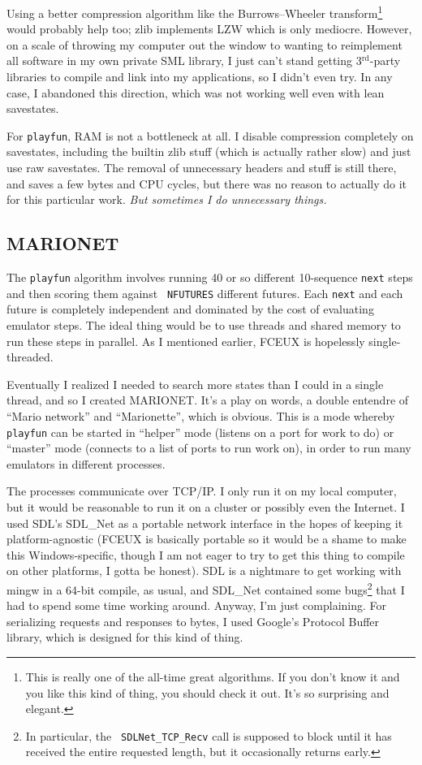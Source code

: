 \documentclass[twocolumn]{article}
\newcommand\rd{$^{\mathrm{rd}}$}
\begin{document}
Using a better compression algorithm like the Burrows--Wheeler
transform\cite{Burrows}\footnote{This is really one of the all-time
  great algorithms. If you don't know it and you like this kind of
  thing, you should check it out. It's so surprising and elegant.}
would probably help too; zlib implements LZW which is only mediocre.
However, on a scale of throwing my computer out the window to wanting
to reimplement all software in my own private SML library, I just
can't stand getting 3\rd-party libraries to compile and link into my
applications, so I didn't even try. In any case, I abandoned this
direction, which was not working well even with lean savestates.

For {\tt playfun}, RAM is not a bottleneck at all. I disable
compression completely on savestates, including the builtin zlib stuff
(which is actually rather slow) and just use raw savestates. The
removal of unnecessary headers and stuff is still there, and saves a
few bytes and CPU cycles, but there was no reason to actually do it
for this particular work. {\em But sometimes I do unnecessary things.}

\subsection{MARIONET}

The {\tt playfun} algorithm involves running 40 or so different
10-sequence {\tt next} steps and then scoring them against {\tt
  NFUTURES} different futures. Each {\tt next} and each future is
completely independent and dominated by the cost of evaluating
emulator steps. The ideal thing would be to use threads and shared
memory to run these steps in parallel. As I mentioned earlier,
FCEUX is hopelessly single-threaded.

Eventually I realized I needed to search more states than I could in a
single thread, and so I created MARIONET. It's a play on words, a
double entendre of ``Mario network'' and ``Marionette'', which is
obvious. This is a mode whereby {\tt playfun} can be started in
``helper'' mode (listens on a port for work to do) or ``master'' mode
(connects to a list of ports to run work on), in order to run
many emulators in different processes.

The processes communicate over TCP/IP. I only run it on my local
computer, but it would be reasonable to run it on a cluster or
possibly even the Internet. I used SDL's SDL\_Net\cite{SDLNet} as a
portable network interface in the hopes of keeping it
platform-agnostic (FCEUX is basically portable so it would be a shame
to make this Windows-specific, though I am not eager to try to get
this thing to compile on other platforms, I gotta be honest). SDL is a
nightmare to get working with mingw in a 64-bit compile, as usual, and
SDL\_Net contained some bugs\footnote{In particular, the {\tt
    SDLNet\_TCP\_Recv} call is supposed to block until it has received
  the entire requested length, but it occasionally returns early.}
that I had to spend some time working around. Anyway, I'm just
complaining. For serializing requests and responses to bytes, I used
Google's Protocol Buffer library\cite{ProtoBuf}, which is designed for
this kind of thing.
\end{document}
